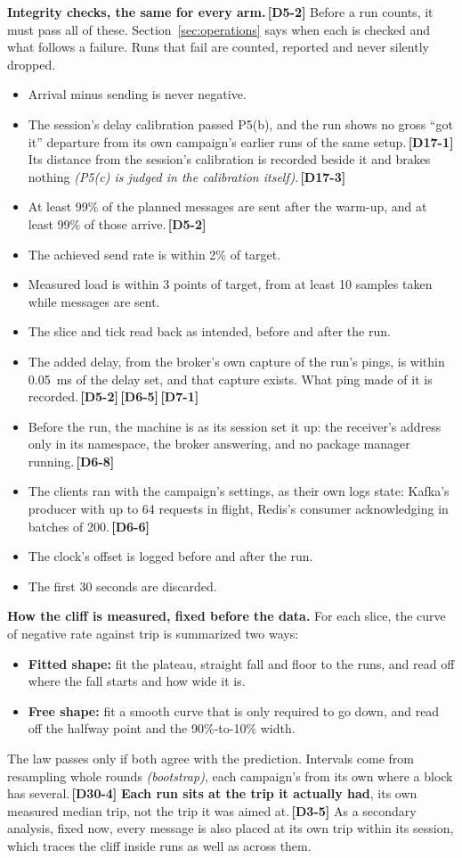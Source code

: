 \documentclass[11pt]{article}
\newcommand{\gl}[1]{{\color{soft}\itshape\small (#1)}}
\newcommand{\chgold}[1]{\,{\color{oldcol}\bfseries\footnotesize[#1]}}
\begin{document}
\textbf{Integrity checks, the same for every arm.}\chgold{D5-2} Before a run counts, it must pass all of these. Section~\ref{sec:operations} says when each is checked and what follows a failure. Runs that fail are counted, reported and never silently dropped.
\begin{itemize}
  \item Arrival minus sending is never negative.
  \item The session's delay calibration passed P5(b), and the run shows no gross ``got it'' departure from its own campaign's earlier runs of the same setup.\chgold{D17-1} Its distance from the session's calibration is recorded beside it and brakes nothing \gl{P5(c) is judged in the calibration itself}.\chgold{D17-3}
  \item At least 99\% of the planned messages are sent after the warm-up, and at least 99\% of those arrive.\chgold{D5-2}
  \item The achieved send rate is within 2\% of target.
  \item Measured load is within 3 points of target, from at least 10 samples taken while messages are sent.
  \item The slice and tick read back as intended, before and after the run.
  \item The added delay, from the broker's own capture of the run's pings, is within 0.05~ms of the delay set, and that capture exists. What ping made of it is recorded.\chgold{D5-2}\chgold{D6-5}\chgold{D7-1}
  \item Before the run, the machine is as its session set it up: the receiver's address only in its namespace, the broker answering, and no package manager running.\chgold{D6-8}
  \item The clients ran with the campaign's settings, as their own logs state: Kafka's producer with up to 64 requests in flight, Redis's consumer acknowledging in batches of 200.\chgold{D6-6}
  \item The clock's offset is logged before and after the run.
  \item The first 30 seconds are discarded.
\end{itemize}

\textbf{How the cliff is measured, fixed before the data.} For each slice, the curve of negative rate against trip is summarized two ways:
\begin{itemize}
  \item \textbf{Fitted shape:} fit the plateau, straight fall and floor to the runs, and read off where the fall starts and how wide it is.
  \item \textbf{Free shape:} fit a smooth curve that is only required to go down, and read off the halfway point and the 90\%-to-10\% width.
\end{itemize}
The law passes only if both agree with the prediction. Intervals come from resampling whole rounds \gl{bootstrap}, each campaign's from its own where a block has several.\chgold{D30-4} \textbf{Each run sits at the trip it actually had}, its own measured median trip, not the trip it was aimed at.\chgold{D3-5} As a secondary analysis, fixed now, every message is also placed at its own trip within its session, which traces the cliff inside runs as well as across them.
\end{document}
